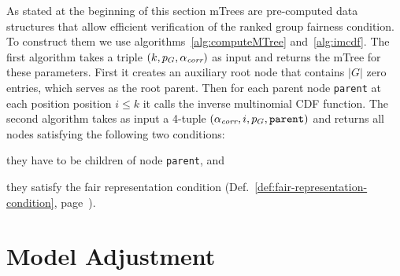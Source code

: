 

As stated at the beginning of this section mTrees are pre-computed data structures that allow efficient verification of the ranked group fairness condition.
%
To construct them we use algorithms~\ref{alg:computeMTree} and~\ref{alg:imcdf}.
%
The first algorithm \algoComputeMTree takes a triple $(k,p_G,\alpha_\textit{corr})$ as input and returns the mTree for these parameters.
%
First it creates an auxiliary root node that contains $|G|$ zero entries, which serves as the root parent.
%
Then for each parent node \texttt{parent} at each position position $i \leq k$ it calls the inverse multinomial CDF function.
%
The second algorithm \algoImcdf takes as input a 4-tuple $(\alpha_\textit{corr}, i, p_G, \texttt{parent})$ and returns all nodes satisfying the following two conditions:
\begin{inparaenum}[(i.)]
	\item they have to be children of node \texttt{parent}, and
	\item they satisfy the fair representation condition (Def.~\ref{def:fair-representation-condition}, page~\pageref{def:fair-representation-condition}).
\end{inparaenum}

\section{Model Adjustment}
\label{sec:model-adjustment}


